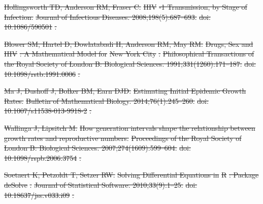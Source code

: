 \documentclass[10pt,letterpaper]{article}
\providecommand{\DIFdeltex}[1]{{\protect\color{red}\sout{#1}}}                      %
\providecommand{\DIFdel}[1]{\texorpdfstring{\DIFdeltex{#1}}{}} %
\begin{document}
\DIFdel{Hollingsworth TD, Anderson RM, Fraser C.
}%
\DIFdel{HIV}%
\DIFdel{-1 Transmission, by Stage of Infection.
}%
\DIFdel{Journal of Infectious Diseases. 2008;198(5):687--693.
}%
\DIFdel{doi:}%
\DIFdel{10.1086/590501}%
\DIFdel{.
}%

\DIFdel{Blower SM, Hartel D, Dowlatabadi H, Anderson RM, May RM.
}%
\DIFdel{Drugs, Sex and }%
\DIFdel{HIV}%
\DIFdel{: A Mathematical Model for }%
\DIFdel{New York City}%
\DIFdel{.
}%
\DIFdel{Philosophical Transactions of the Royal Society of London B:
  Biological Sciences. 1991;331(1260):171--187.
}%
\DIFdel{doi:}%
\DIFdel{10.1098/rstb.1991.0006}%
\DIFdel{.
}%

\DIFdel{Ma J, Dushoff J, Bolker BM, Earn DJD.}%
\DIFdel{Estimating Initial Epidemic Growth Rates. }%
\DIFdel{Bulletin of Mathematical Biology. 2014;76(1):245--260.
}%
\DIFdel{doi:}%
\DIFdel{10.1007/s11538-013-9918-2}%
\DIFdel{.
}%

\DIFdel{Wallinga J, Lipsitch M.
}%
\DIFdel{How generation intervals shape the relationship between growth rates
  and reproductive numbers.
}%
\DIFdel{Proceedings of the Royal Society of London B: Biological Sciences.
  2007;274(1609):599--604.
}%
\DIFdel{doi:}%
\DIFdel{10.1098/rspb.2006.3754}%
\DIFdel{.
}%

\DIFdel{Soetaert K, Petzoldt T, Setzer RW.
}%
\DIFdel{Solving Differential Equations in }%
\DIFdel{R}%
\DIFdel{: Package }%
\DIFdel{deSolve}%
\DIFdel{.
}%
\DIFdel{Journal of Statistical Software. 2010;33(9):1--25.
}%
\DIFdel{doi:}%
\DIFdel{10.18637/jss.v033.i09}%
\DIFdel{.
}%
\end{document}
